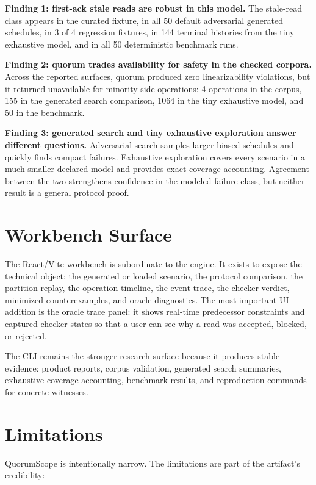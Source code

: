 \documentclass[10pt]{article}
\newcommand{\qs}{QuorumScope}
\newcommand{\firstack}{first-ack}
\newcommand{\quorum}{quorum}
\begin{document}
\textbf{Finding 1: \firstack{} stale reads are robust in this model.} The stale-read class appears
in the curated fixture, in all 50 default adversarial generated schedules, in 3 of 4 regression
fixtures, in 144 terminal histories from the tiny exhaustive model, and in all 50 deterministic
benchmark runs.

\textbf{Finding 2: \quorum{} trades availability for safety in the checked corpora.} Across the
reported surfaces, \quorum{} produced zero linearizability violations, but it returned
unavailable for minority-side operations: 4 operations in the corpus, 155 in the generated search
comparison, 1064 in the tiny exhaustive model, and 50 in the benchmark.

\textbf{Finding 3: generated search and tiny exhaustive exploration answer different questions.}
Adversarial search samples larger biased schedules and quickly finds compact failures. Exhaustive
exploration covers every scenario in a much smaller declared model and provides exact coverage
accounting. Agreement between the two strengthens confidence in the modeled failure class, but
neither result is a general protocol proof.

\section{Workbench Surface}

The React/Vite workbench is subordinate to the engine. It exists to expose the technical object:
the generated or loaded scenario, the protocol comparison, the partition replay, the operation
timeline, the event trace, the checker verdict, minimized counterexamples, and oracle
diagnostics. The most important UI addition is the oracle trace panel: it shows real-time
predecessor constraints and captured checker states so that a user can see why a read was
accepted, blocked, or rejected.

The CLI remains the stronger research surface because it produces stable evidence: product
reports, corpus validation, generated search summaries, exhaustive coverage accounting, benchmark
results, and reproduction commands for concrete witnesses.

\section{Limitations}

\qs{} is intentionally narrow. The limitations are part of the artifact's credibility:
\end{document}

